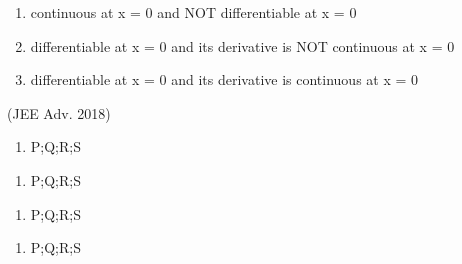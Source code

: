 \documentclass[journal,12pt,twocolumn]{IEEEtran}
\theoremstyle{remark}
\begin{document}
\begin{enumerate}
\begin{multicols}{2}
\begin{enumerate}
					\item[2.]  continuous at x = 0 and NOT differentiable at x = 0
					\item[3.] differentiable at x = 0 and its derivative is NOT continuous at x = 0
					\item[4.] differentiable at x = 0 and its derivative is continuous at x = 0
				\end{enumerate}
                 \hfill(JEE Adv. 2018)
		\end{multicols}
            \begin{multicols}{2}
			\begin{enumerate}[label=(\alph*)]
				\item P;Q;R;S
			\end{enumerate}
			\begin{enumerate}[label=(\alph*), start=3]
				\item P;Q;R;S
			\end{enumerate}
			\columnbreak
			\begin{enumerate}[label=(\alph*), start=2]
				\item P;Q;R;S 
			\end{enumerate}
			\begin{enumerate}[label=(\alph*)]
				\item P;Q;R;S
			\end{enumerate}
		\end{multicols}
             \end{enumerate}
\twocolumn
\end{document}
